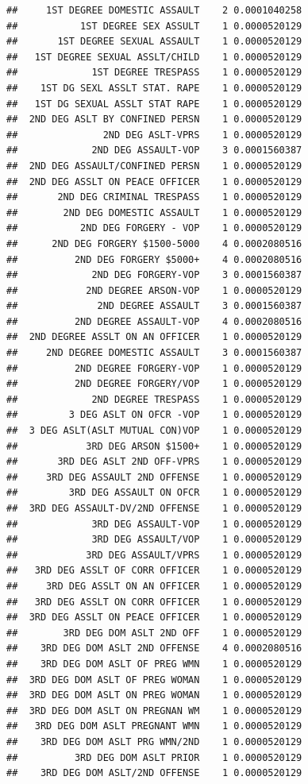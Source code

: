\documentclass[]{book}
\begin{document}
\begin{verbatim}
##     1ST DEGREE DOMESTIC ASSAULT    2 0.0001040258
##           1ST DEGREE SEX ASSULT    1 0.0000520129
##       1ST DEGREE SEXUAL ASSAULT    1 0.0000520129
##   1ST DEGREE SEXUAL ASSLT/CHILD    1 0.0000520129
##             1ST DEGREE TRESPASS    1 0.0000520129
##    1ST DG SEXL ASSLT STAT. RAPE    1 0.0000520129
##   1ST DG SEXUAL ASSLT STAT RAPE    1 0.0000520129
##  2ND DEG ASLT BY CONFINED PERSN    1 0.0000520129
##               2ND DEG ASLT-VPRS    1 0.0000520129
##             2ND DEG ASSAULT-VOP    3 0.0001560387
##  2ND DEG ASSAULT/CONFINED PERSN    1 0.0000520129
##  2ND DEG ASSLT ON PEACE OFFICER    1 0.0000520129
##       2ND DEG CRIMINAL TRESPASS    1 0.0000520129
##        2ND DEG DOMESTIC ASSAULT    1 0.0000520129
##           2ND DEG FORGERY - VOP    1 0.0000520129
##      2ND DEG FORGERY $1500-5000    4 0.0002080516
##          2ND DEG FORGERY $5000+    4 0.0002080516
##             2ND DEG FORGERY-VOP    3 0.0001560387
##            2ND DEGREE ARSON-VOP    1 0.0000520129
##              2ND DEGREE ASSAULT    3 0.0001560387
##          2ND DEGREE ASSAULT-VOP    4 0.0002080516
##  2ND DEGREE ASSLT ON AN OFFICER    1 0.0000520129
##     2ND DEGREE DOMESTIC ASSAULT    3 0.0001560387
##          2ND DEGREE FORGERY-VOP    1 0.0000520129
##          2ND DEGREE FORGERY/VOP    1 0.0000520129
##             2ND DEGREE TRESPASS    1 0.0000520129
##         3 DEG ASLT ON OFCR -VOP    1 0.0000520129
##  3 DEG ASLT(ASLT MUTUAL CON)VOP    1 0.0000520129
##            3RD DEG ARSON $1500+    1 0.0000520129
##       3RD DEG ASLT 2ND OFF-VPRS    1 0.0000520129
##     3RD DEG ASSAULT 2ND OFFENSE    1 0.0000520129
##         3RD DEG ASSAULT ON OFCR    1 0.0000520129
##  3RD DEG ASSAULT-DV/2ND OFFENSE    1 0.0000520129
##             3RD DEG ASSAULT-VOP    1 0.0000520129
##             3RD DEG ASSAULT/VOP    1 0.0000520129
##            3RD DEG ASSAULT/VPRS    1 0.0000520129
##   3RD DEG ASSLT OF CORR OFFICER    1 0.0000520129
##     3RD DEG ASSLT ON AN OFFICER    1 0.0000520129
##   3RD DEG ASSLT ON CORR OFFICER    1 0.0000520129
##  3RD DEG ASSLT ON PEACE OFFICER    1 0.0000520129
##        3RD DEG DOM ASLT 2ND OFF    1 0.0000520129
##    3RD DEG DOM ASLT 2ND OFFENSE    4 0.0002080516
##    3RD DEG DOM ASLT OF PREG WMN    1 0.0000520129
##  3RD DEG DOM ASLT OF PREG WOMAN    1 0.0000520129
##  3RD DEG DOM ASLT ON PREG WOMAN    1 0.0000520129
##  3RD DEG DOM ASLT ON PREGNAN WM    1 0.0000520129
##   3RD DEG DOM ASLT PREGNANT WMN    1 0.0000520129
##    3RD DEG DOM ASLT PRG WMN/2ND    1 0.0000520129
##          3RD DEG DOM ASLT PRIOR    1 0.0000520129
##    3RD DEG DOM ASLT/2ND OFFENSE    1 0.0000520129

\end{verbatim}
\end{document}
